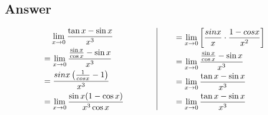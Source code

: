 \documentclass[17pt]{extarticle}
\begin{document}
\begin{fleqn}

\section{Answer}

\begin{equation} \nonumber
\begin{alignedat}{4}
& \texttt{\ \ } \lim_{x \to 0} \frac{\tan{x} - \sin{x}}{x^3}\\
&= \lim_{x \to 0} \frac{\frac{\sin{x}}{\cos{x}}-\sin{x}}{x^3}\\
&= \frac{sin x\left(\frac{1}{cos x} - 1\right)}{x^3}\\
&= \lim_{x \to 0} \frac{\sin{x}(1  - \cos{x})}{x^3\cos{x}}\\
\end{alignedat}
\qquad
\qquad
\vrule
\qquad
\begin{alignedat}{4}
&= \lim_{x \to 0}\left[\frac{sin x}{x}\cdot\frac{1 - cos x}{x^2} \right] \\
&= \lim_{x \to 0} \frac{\frac{\sin{x}}{\cos{x}}-\sin{x}}{x^3}\\
&= \lim_{x \to 0} \frac{\tan{x} - \sin{x}}{x^3}\\
&= \lim_{x \to 0} \frac{\tan{x} - \sin{x}}{x^3}\\
\end{alignedat}
\end{equation}



\end{fleqn}
\end{document}

